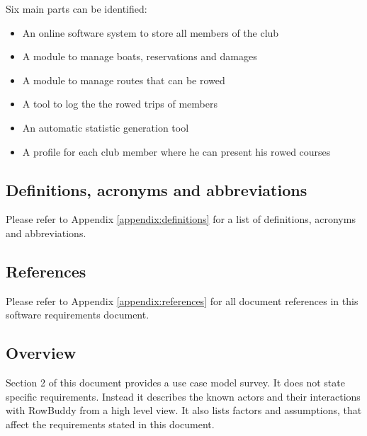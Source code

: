	Six main parts can be identified:
	\begin{itemize}
		\item An online software system to store all members of the club
		\item A module to manage boats, reservations and damages
		\item A module to manage routes that can be rowed
		\item A tool to log the the rowed trips of members
		\item An automatic statistic generation tool
		\item A profile for each club member where he can present his rowed courses
	\end{itemize}
	
	\subsection {Definitions, acronyms and abbreviations}
	Please refer to Appendix \ref{appendix:definitions} for a list of definitions, acronyms and abbreviations.
	
	
	\subsection{References}
	Please refer to Appendix \ref{appendix:references} for all document references in this software requirements document.
	
	\subsection{Overview}
	Section 2 of this document provides a use case model survey. It does not state specific requirements. Instead it describes the known actors and their interactions with RowBuddy from a high level view. It also lists factors and assumptions, that affect the requirements stated in this document.